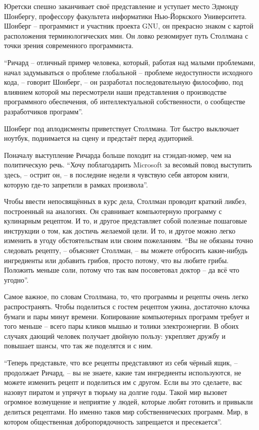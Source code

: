 Юретски спешно заканчивает своё представление и уступает место Эдмонду Шонбергу, профессору факультета информатики Нью-Йоркского Университета. Шонберг -- программист и участник проекта GNU, он прекрасно знаком с картой расположения терминологических мин. Он ловко резюмирует путь Столлмана с точки зрения современного программиста.

``Ричард -- отличный пример человека, который, работая над малыми проблемами, начал задумываться о проблеме глобальной -- проблеме недоступности исходного кода, -- говорит Шонберг, -- он разработал последовательную философию, под влиянием которой мы пересмотрели наши представления о производстве программного обеспечения, об интеллектуальной собственности, о сообществе разработчиков программ''.

Шонберг под аплодисменты приветствует Столлмана. Тот быстро выключает ноутбук, поднимается на сцену и предстаёт перед аудиторией.

Поначалу выступление Ричарда больше походит на стэндап-номер, чем на политическую речь. ``Хочу поблагодарить Microsoft за весомый повод выступить здесь, -- острит он, -- в последние недели я чувствую себя автором книги, которую где-то запретили в рамках произвола''.

Чтобы ввести непосвящённых в курс дела, Столлман проводит краткий ликбез, построенный на аналогиях. Он сравнивает компьютерную программу с кулинарным рецептом. И то, и другое представляет собой полезные пошаговые инструкции о том, как достичь желаемой цели. И то, и другое можно легко изменить в угоду обстоятельствам или своим пожеланиям. ``Вы не обязаны точно следовать рецепту, -- объясняет Столлман, -- вы можете отбросить какие-нибудь ингредиенты или добавить грибов, просто потому, что вы любите грибы. Положить меньше соли, потому что так вам посоветовал доктор -- да всё что угодно''.

Самое важное, по словам Столлмана, то, что программы и рецепты очень легко распространять. Чтобы поделиться с гостем рецептом ужина, достаточно клочка бумаги и пары минут времени. Копирование компьютерных программ требует и того меньше -- всего пары кликов мышью и толики электроэнергии. В обоих случаях дающий человек получает двойную пользу: укрепляет дружбу и повышает шансы, что так же поделятся и с ним.

``Теперь представьте, что все рецепты представляют из себя чёрный ящик, -- продолжает Ричард, -- вы не знаете, какие там ингредиенты используются, не можете изменить рецепт и поделиться им с другом. Если вы это сделаете, вас назовут пиратом и упрячут в тюрьму на долгие годы. Такой мир вызовет огромное возмущение и неприятие у людей, которые любят готовить и привыкли делиться рецептами. Но именно таков мир собственнических программ. Мир, в котором общественная добропорядочность запрещается и пресекается''.


